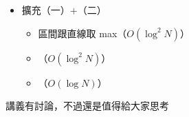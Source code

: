 \begin{frame}{}
    \begin{itemize}
        \item 擴充（一）$+$（二）
        \begin{itemize}
            \item 區間跟直線取 max（$O(\log^2 N)$）
            \item {}（$O(\log^2 N)$）
            \item {}（$O(\log N)$）
        \end{itemize}
    \end{itemize}

    講義有討論，不過還是值得給大家思考
\end{frame}
